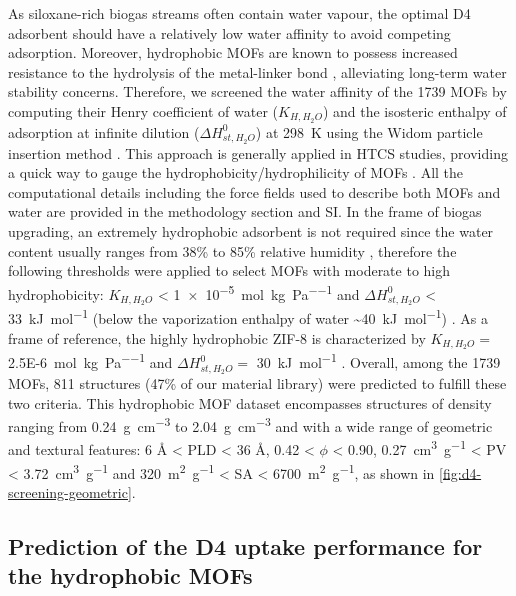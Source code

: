 As siloxane-rich biogas streams often contain water vapour, the optimal D4
adsorbent should have a relatively low water affinity to avoid competing
adsorption. Moreover, hydrophobic MOFs are known to possess increased resistance
to the hydrolysis of the metal-linker bond
\citep{burtchWaterStabilityAdsorption2014,
wuEnhancingStabilityMetalorganic2010}, alleviating long-term water stability
concerns. Therefore, we screened the water affinity of the 1739 MOFs by
computing their Henry coefficient of water (\(K_{H,H_{2}O}\)) and the isosteric
enthalpy of adsorption at infinite dilution (\(\Delta H_{st,H_{2}O}^{0}\)) at
\SI{298}{\kelvin} using the Widom particle insertion method
\citep{frenkelUnderstandingMolecularSimulation2002}. This approach is generally
applied in HTCS studies, providing a quick way to gauge the
hydrophobicity/hydrophilicity of MOFs
\citep{matito-martosDiscoveryOptimalPorous2018,
qiaoHighthroughputComputationalScreening2017}. All the computational details
including the force fields used to describe both MOFs and water are provided in
the methodology section and SI. In the frame of biogas upgrading, an extremely
hydrophobic adsorbent is not required since the water content usually ranges
from 38\% to 85\% relative humidity \citep{wangRecentAdvancesTechnologies2019},
therefore the following thresholds were applied to select MOFs with moderate to
high hydrophobicity: \(K_{H,H_{2}O}\) < \SI{1e-5}{\mol\per\kilo\gram\per\pascal}
and \(\Delta H_{st,H_{2}O}^{0}\) < \SI{33}{\kilo\joule\per\mol} (below the
vaporization enthalpy of water \textasciitilde \SI{40}{\kilo\joule\per\mol})
\citep{lemmonNISTStandardReference2018}. As a frame of reference, the highly
hydrophobic ZIF-8 is characterized by \(K_{H,H_{2}O} =\)
\SI{2.5E-6}{\mol\per\kilo\gram\per\pascal} and \(\Delta H_{st,H_{2}O}^{0} = \)
\SI{30}{\kilo\joule\per\mol}
\citep{moghadamEfficientIdentificationHydrophobic2016}. Overall, among the 1739
MOFs, 811 structures (47\% of our material library) were predicted to fulfill
these two criteria. This hydrophobic MOF dataset encompasses structures of
density ranging from \SI{0.24}{\gram\per\centi\metre\cubed} to
\SI{2.04}{\gram\per\centi\metre\cubed} and with a wide range of geometric and
textural features: 6 Å < PLD < 36 Å, 0.42 < \(\phi\) < 0.90,
\SI{0.27}{\centi\metre\cubed\per\gram} < PV <
\SI{3.72}{\centi\metre\cubed\per\gram} and \SI{320}{\metre\squared\per\gram} <
SA < \SI{6700}{\metre\squared\per\gram}, as shown in
\cref{fig:d4-screening-geometric}.

\subsection{Prediction of the D4 uptake performance for the hydrophobic MOFs}\label{d4-screening}

